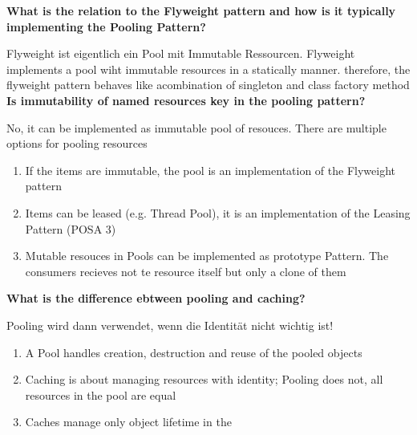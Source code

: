 \textbf{What is the relation to the Flyweight pattern and how is it typically implementing the Pooling Pattern?}

Flyweight ist eigentlich ein Pool mit Immutable Ressourcen. Flyweight implements a pool wiht immutable resources in a statically manner. therefore, the flyweight pattern behaves like acombination of singleton and class factory method \\

\textbf{Is immutability of named resources key in the pooling pattern?}

No, it can be implemented as immutable pool of resouces. There are multiple options for pooling resources

\begin{enumerate}
    \item If the items are immutable, the pool is an implementation of the Flyweight pattern
    \item Items can be leased (e.g. Thread Pool), it is an implementation of the Leasing Pattern (POSA 3)
    \item Mutable resouces in Pools can be implemented as prototype Pattern. The consumers recieves not te resource itself but only a clone of them
\end{enumerate}
\vspace{10pt}
\textbf{What is the difference ebtween pooling and caching?}

Pooling wird dann verwendet, wenn die Identität nicht wichtig ist!

\begin{enumerate}
    \item A Pool handles creation, destruction and reuse of the pooled objects
    \item Caching is about managing resources with identity; Pooling does not, all resources in the pool are equal
    \item Caches manage only object lifetime in the
\end{enumerate}
